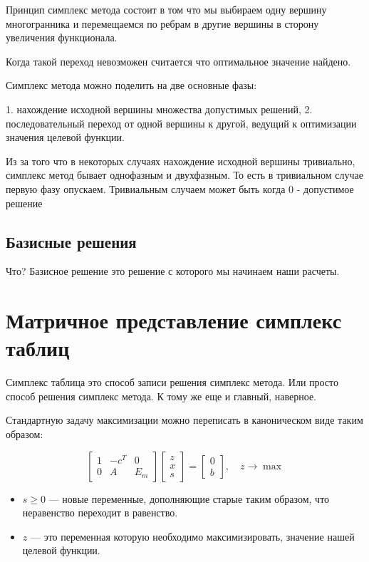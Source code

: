 \documentclass[a4paper,article,14pt]{extarticle}
\begin{document}
Принцип симплекс метода состоит в том что мы выбираем одну вершину многогранника и перемещаемся по ребрам в другие вершины в сторону увеличения функционала.

Когда такой переход невозможен считается что оптимальное значение найдено.

Симплекс метода можно поделить на две основные фазы:

1. нахождение исходной вершины множества допустимых решений,
2. последовательный переход от одной вершины к другой, ведущий к оптимизации значения целевой функции.

Из за того что в некоторых случаях нахождение исходной вершины тривиально, симплекс метод бывает однофазным и двухфазным.
То есть в тривиальном случае первую фазу опускаем.
Тривиальным случаем может быть когда 0 - допустимое решение

\subsection{Базисные решения}

Что?
Базисное решение это решение с которого мы начинаем наши расчеты.

\section{Матричное представление симплекс таблиц}

Симплекс таблица это способ записи решения симплекс метода.
Или просто способ решения симплекс метода.
К тому же еще и главный, наверное.

Стандартную задачу максимизации можно переписать в каноническом виде таким образом:

\begin{equation}
    \begin{bmatrix}
        1 & -c^T & 0 \\
        0 & A & E_m
    \end{bmatrix}
    \begin{bmatrix}
        z \\ x \\ s
    \end{bmatrix}
    =
    \begin{bmatrix}
        0 \\ b
    \end{bmatrix}
    , \quad
    z \rightarrow \max
\end{equation}

\begin{itemize}
    \item \(s \ge 0\) --- новые переменные, дополняющие старые таким образом, что неравенство переходит в равенство.
    \item \(z\) --- это переменная которую необходимо максимизировать, значение нашей целевой функции.
\end{itemize}
\end{document}
